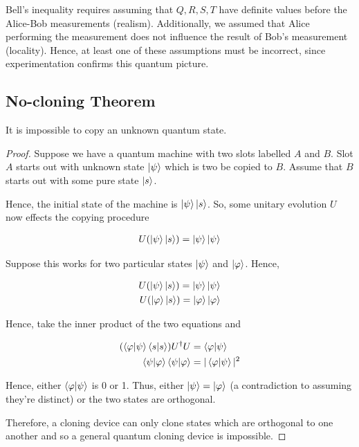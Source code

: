 \documentclass[11pt]{article}
\newcommand\0{\mathbf{0}}
\newcommand\<{\langle}
\renewcommand\>{\rangle}
\renewcommand\phi{\varphi}
\begin{document}
Bell's inequality requires assuming that $Q,R,S,T$ have definite values before the Alice-Bob measurements (realism). Additionally, we assumed that Alice performing the measurement does not influence the result of Bob's measurement (locality). Hence, at least one of these assumptions must be incorrect, since experimentation confirms this quantum picture.


\subsection{No-cloning Theorem}

It is impossible to copy an unknown quantum state.

\begin{proof}
Suppose we have a quantum machine with two slots labelled $A$ and $B$. Slot $A$ starts out with unknown state $\ket{\psi}$ which is two be copied to $B$. Assume that $B$ starts out with some pure state $\ket{s}$.

Hence, the initial state of the machine is $\ket{\psi}\ket{s}$. So, some unitary evolution $U$ now effects the copying procedure

\begin{align*}
	U(\ket{\psi}\ket{s}) = \ket{\psi}\ket{\psi}
\end{align*}
	
	Suppose this works for two particular states $\ket{\psi}$ and $\ket{\phi}$. Hence,
	
	\begin{align*}
		U(\ket{\psi}\ket{s}) = \ket{\psi}\ket{\psi} \\
		U(\ket{\phi}\ket{s}) = \ket{\phi}\ket{\phi}
	\end{align*}
	
	Hence, take the inner product of the two equations and 
	
	\begin{align*}
		(\bra{\phi}\ket{\psi}\bra{s}\ket{s})U^\dag U &= \bra{\phi}\ket{\psi} \\
		\bra{\psi}\ket{\phi}\bra{\psi}\ket{\phi} &= |\bra{\phi}\ket{\psi}|^2
	\end{align*}
	
	Hence, either $\bra{\phi}\ket{\psi}$ is 0 or 1. Thus, either $\ket{\psi} = \ket{\phi}$ (a contradiction to assuming they're distinct) or the two states are orthogonal.
	
	Therefore, a cloning device can only clone states which are orthogonal to one another and so a general quantum cloning device is impossible.  
\end{proof}
\end{document}
